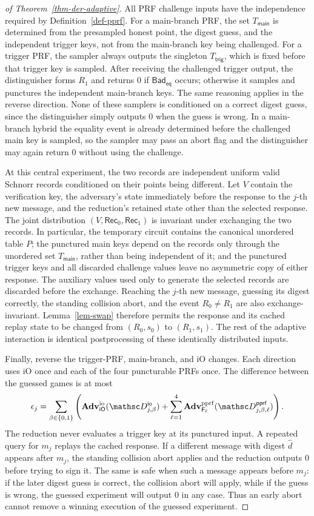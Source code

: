 \begin{proof}[of Theorem~\ref{thm-der-adaptive}]
All PRF challenge inputs have the independence required by Definition~\ref{def-pprf}. For a main-branch PRF, the set $T_{\mathsf{main}}$ is determined from the presampled honest point, the digest guess, and the independent trigger keys, not from the main-branch key being challenged. For a trigger PRF, the sampler always outputs the singleton $T_{\mathsf{trig}}$, which is fixed before that trigger key is sampled. After receiving the challenged trigger output, the distinguisher forms $R_1$ and returns 0 if $\mathsf{Bad}_{\mathsf{eq}}$ occurs; otherwise it samples and punctures the independent main-branch keys. The same reasoning applies in the reverse direction. None of these samplers is conditioned on a correct digest guess, since the distinguisher simply outputs 0 when the guess is wrong. In a main-branch hybrid the equality event is already determined before the challenged main key is sampled, so the sampler may pass an abort flag and the distinguisher may again return 0 without using the challenge.

At this central experiment, the two records are independent uniform valid Schnorr records conditioned on their points being different. Let $V$ contain the verification key, the adversary's state immediately before the response to the $j$-th new message, and the reduction's retained state other than the selected response. The joint distribution $(V,\mathsf{Rec}_0,\mathsf{Rec}_1)$ is invariant under exchanging the two records. In particular, the temporary circuit contains the canonical unordered table $P$; the punctured main keys depend on the records only through the unordered set $T_{\mathsf{main}}$, rather than being independent of it; and the punctured trigger keys and all discarded challenge values leave no asymmetric copy of either response. The auxiliary values used only to generate the selected records are discarded before the exchange. Reaching the $j$-th new message, guessing its digest correctly, the standing collision abort, and the event $R_0\ne R_1$ are also exchange-invariant. Lemma~\ref{lem-swap} therefore permits the response and its cached replay state to be changed from $(R_0,s_0)$ to $(R_1,s_1)$. The rest of the adaptive interaction is identical postprocessing of these identically distributed inputs.

Finally, reverse the trigger-PRF, main-branch, and iO changes. Each direction uses iO once and each of the four puncturable PRFs once. The difference between the guessed games is at most
$$
\epsilon_j
=
\sum_{\beta\in\{0,1\}}
\left(
\AdvIO{\iO}{\advD^{\mathsf{io}}_{j,\beta}}
+\sum_{\ell=1}^{4}\AdvPPRF{\PRF_\ell}{\advD^{\mathsf{pprf}}_{j,\beta,\ell}}
\right).
$$
The reduction never evaluates a trigger key at its punctured input. A repeated query for $m_j$ replays the cached response. If a different message with digest $\widehat d$ appears after $m_j$, the standing collision abort applies and the reduction outputs 0 before trying to sign it. The same is safe when such a message appears before $m_j$: if the later digest guess is correct, the collision abort will apply, while if the guess is wrong, the guessed experiment will output 0 in any case. Thus an early abort cannot remove a winning execution of the guessed experiment.


\end{proof}
